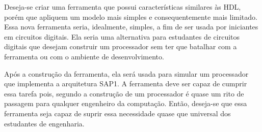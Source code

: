 Deseja-se criar uma ferramenta que possui características similares às HDL, porém que apliquem um modelo mais simples e consequentemente mais limitado.
Essa nova ferramenta seria, idealmente, simples, a fim de ser usada por iniciantes em circuitos digitais.
Ela seria uma alternativa para estudantes de circuitos digitais que desejam construir um processador sem ter que batalhar com a ferramenta ou com o ambiente de desenvolvimento.

Após a construção da ferramenta, ela será usada para simular um processador que implementa a arquitetura SAP1.
A ferramenta deve ser capaz de cumprir essa tarefa pois, segundo \textcite{harris} a construção de um processador é quase um rito de passagem para qualquer engenheiro da computação.
Então, deseja-se que essa ferramenta seja capaz de suprir essa necessidade quase que universal dos estudantes de engenharia.
